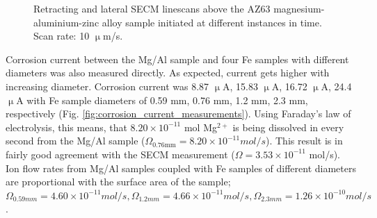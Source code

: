 \begin{figure}
\caption[Retracting and lateral SECM linescans above the AZ63 sample initiated at different instances in time.]{Retracting and lateral SECM linescans above the AZ63 magnesium-aluminium-zinc alloy sample initiated at different instances in time.
Scan rate: 10 $\upmu$m/s.}
\label{fig:retracting}
\end{figure}

Corrosion current between the Mg/Al sample and four Fe samples with different diameters was also measured directly.
As expected, current gets higher with increasing diameter.
Corrosion current was 8.87 $\upmu$A, 15.83 $\upmu$A, 16.72 $\upmu$A, 24.4 $\upmu$A with Fe sample diameters of 0.59 mm, 0.76 mm, 1.2 mm, 2.3 mm, respectively (Fig. \ref{fig:corrosion_current_measurements}).
Using Faraday's law of electrolysis, this means, that $8.20\times10^{-11}$ mol Mg$^{2+}$ is being dissolved in every second from the Mg/Al sample ($\Omega_{0.76 \textrm{mm}} = 8.20\times10^{-11} mol/s$).
This result is in fairly good agreement with the SECM measurement ($\Omega = 3.53\times10^{-11}$ mol/s).
Ion flow rates from Mg/Al samples coupled with Fe samples of different diameters are proportional with the surface area of the sample; $\Omega_{0.59mm} = 4.60\times10^{-11} mol/s, \Omega_{1.2mm} = 4.66\times10^{-11} mol/s, \Omega_{2.3mm} = 1.26\times10^{-10} mol/s$.

